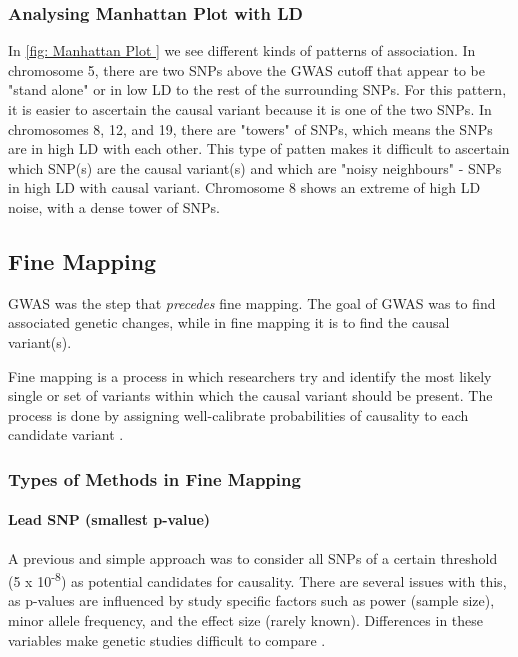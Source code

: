 \subsubsection{Analysing Manhattan Plot with LD}

In \ref{fig: Manhattan Plot } we see different kinds of patterns of association. In chromosome 5, there are two SNPs above the GWAS cutoff that appear to be "stand alone" or in low LD to the rest of the surrounding SNPs. For this pattern, it is easier to ascertain the causal variant because it is one of the two SNPs. In chromosomes 8, 12, and 19, there are "towers" of SNPs, which means the SNPs are in high LD with each other. This type of patten makes it difficult to ascertain which SNP(s) are the causal variant(s) and which are "noisy neighbours" - SNPs in high LD with causal variant. Chromosome 8 shows an extreme of high LD noise, with a dense tower of SNPs. 

\subsection{Fine Mapping} 
GWAS was the step that \emph{precedes} fine mapping. The goal of GWAS was to find associated genetic changes, while in fine mapping it is to find the causal variant(s). 

Fine mapping is a process in which researchers try and identify the most likely single or set of variants within which the causal variant should be present. The process is done by assigning well-calibrate probabilities of causality to each candidate variant \cite{Spain2015}. 

\subsubsection{Types of Methods in Fine Mapping}

\paragraph{Lead SNP (smallest p-value)} \label{Lead SNP (smallest p-value}
A previous and simple approach was to consider all SNPs of a certain threshold (5 x 10\textsuperscript{-8}) as potential candidates for causality. There are several issues with this, as p-values are influenced by study specific factors such as power (sample size), minor allele frequency, and the effect size (rarely known). Differences in these variables make genetic studies difficult to compare \cite{Spain2015}. 


